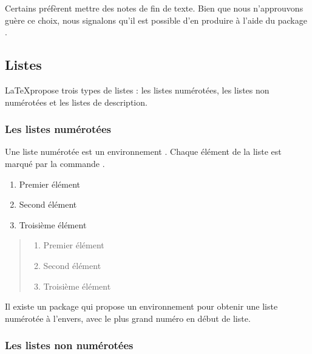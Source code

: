 \begin{plusloins}
	Certains préfèrent mettre des notes de fin de texte. Bien que nous n'approuvons guère ce choix, nous signalons qu'il est possible d'en produire à l'aide du package .
\end{plusloins}

\subsection{Listes}

\LaTeX propose trois types de listes : les listes numérotées, les listes non numérotées et les listes de description.

\subsubsection{Les listes numérotées}

Une liste numérotée est un environnement .
Chaque élément de la liste est marqué par la commande .

\begin{latexcode}
\begin{enumerate}
	\item Premier élément
	\item Second élément
	\item Troisième élément
\end{enumerate}
\end{latexcode}

\begin{quotation}
\noindent\begin{enumerate}
	\item Premier élément
	\item Second élément
	\item Troisième élément
\end{enumerate}
\end{quotation}

\begin{plusloins}
Il existe un package  qui propose un environnement   pour obtenir une liste numérotée à l'envers, avec le plus grand numéro en début de liste.

\end{plusloins}
\subsubsection{Les listes non numérotées}

